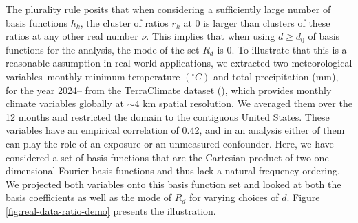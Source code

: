 \documentclass[
  12pt]{article}
\begin{document}
The plurality rule  posits that when considering a sufficiently large number of basis functions $h_k$, the cluster of ratios $r_{k}$ at $0$ is larger than clusters of these ratios at any other real number $\nu$. 
This implies that when using  $d \geq d_0$  of basis functions for the analysis, the mode of the set $R_d$ is $0$. To illustrate that this is a reasonable assumption in real world applications, we extracted two meteorological variables--monthly minimum temperature $(^\circ C)$ and total precipitation (mm), for the year 2024-- from the TerraClimate dataset (\cite{abatzoglou2018terraclimate}), which provides monthly climate variables globally at $\sim 4$ km spatial resolution. We averaged them over the 12 months and restricted the domain to the contiguous United States. These variables have an empirical correlation of 0.42, and in an analysis either of them can play the role of an exposure or an unmeasured confounder. Here, we have considered a set of basis functions that are the Cartesian product of two one-dimensional Fourier basis functions and thus lack a natural frequency ordering.  We projected both variables onto this basis function set and looked at both the basis coefficients as well as the mode of $R_d$ for varying choices of $d$. %
Figure \ref{fig:real-data-ratio-demo} presents the illustration.
\end{document}
